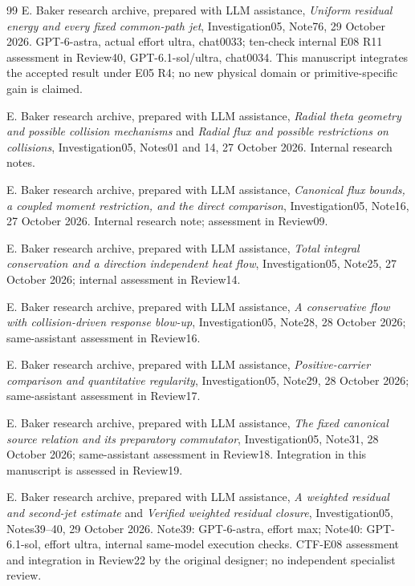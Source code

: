 \documentclass[11pt]{article}
\numberwithin{equation}{section}
\begin{document}
\begin{thebibliography}{99}
E. Baker research archive, prepared with LLM assistance,
\emph{Uniform residual energy and every fixed common-path jet},
Investigation05, Note76, 29 October 2026.
GPT-6-astra, actual effort ultra, chat0033; ten-check internal E08 R11
assessment in Review40, GPT-6.1-sol/ultra, chat0034. This manuscript
integrates the accepted result under E05 R4; no new physical domain
or primitive-specific gain is claimed.

E. Baker research archive, prepared with LLM assistance,
\emph{Radial theta geometry and possible collision mechanisms}
and \emph{Radial flux and possible restrictions on collisions},
Investigation05, Notes01 and 14, 27 October 2026. Internal research notes.

E. Baker research archive, prepared with LLM assistance,
\emph{Canonical flux bounds, a coupled moment restriction, and the direct comparison},
Investigation05, Note16, 27 October 2026. Internal research note;
assessment in Review09.

E. Baker research archive, prepared with LLM assistance,
\emph{Total integral conservation and a direction independent heat flow},
Investigation05, Note25, 27 October 2026; internal assessment in Review14.

E. Baker research archive, prepared with LLM assistance,
\emph{A conservative flow with collision-driven response blow-up},
Investigation05, Note28, 28 October 2026; same-assistant assessment
in Review16.

E. Baker research archive, prepared with LLM assistance,
\emph{Positive-carrier comparison and quantitative regularity},
Investigation05, Note29, 28 October 2026; same-assistant assessment
in Review17.

E. Baker research archive, prepared with LLM assistance,
\emph{The fixed canonical source relation and its preparatory commutator},
Investigation05, Note31, 28 October 2026; same-assistant assessment
in Review18. Integration in this manuscript is assessed in Review19.

E. Baker research archive, prepared with LLM assistance,
\emph{A weighted residual and second-jet estimate} and
\emph{Verified weighted residual closure}, Investigation05,
Notes39--40, 29 October 2026. Note39: GPT-6-astra, effort max;
Note40: GPT-6.1-sol, effort ultra, internal same-model execution checks.
CTF-E08 assessment and integration in Review22 by the original designer;
no independent specialist review.


\end{thebibliography}
\end{document}
